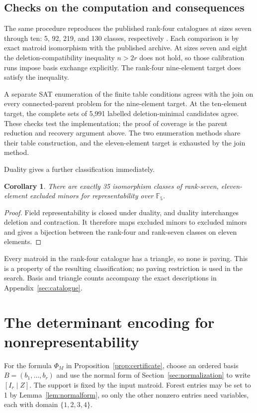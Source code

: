 \documentclass[11pt,a4paper]{article}
\newtheorem{corollary}[theorem]{Corollary}
\theoremstyle{definition}
\newcommand{\F}{\mathbb F_5}
\begin{document}
\subsection{Checks on the computation and consequences}

The same procedure reproduces the published rank-four catalogues
at sizes seven through ten: 5, 92, 219, and 130 classes,
respectively \cite{brettell}. Each comparison is by exact
matroid isomorphism with the published archive. At sizes seven
and eight the deletion-compatibility inequality $n>2r$ does not
hold, so those calibration runs impose basis exchange explicitly.
The rank-four nine-element target does satisfy the inequality.

A separate SAT enumeration of the finite table conditions agrees
with the join on every connected-parent problem for the
nine-element target. At the ten-element target, the complete
sets of 5,991 labelled deletion-minimal candidates agree. These
checks test the implementation; the proof of coverage is the
parent reduction and recovery argument above. The two enumeration
methods share their table construction, and the eleven-element
target is exhausted by the join method.

Duality gives a further classification immediately.
\begin{corollary}\label{cor:dual}
There are exactly 35 isomorphism classes of rank-seven,
eleven-element excluded minors for representability over $\F$.
\end{corollary}
\begin{proof}
Field representability is closed under duality, and duality
interchanges deletion and contraction. It therefore maps
excluded minors to excluded minors and gives a bijection between
the rank-four and rank-seven classes on eleven elements.
\end{proof}

Every matroid in the rank-four catalogue has a triangle, so none
is paving. This is a property of the resulting classification;
no paving restriction is used in the search. Basis and triangle
counts accompany the exact descriptions in
Appendix~\ref{sec:catalogue}.

\appendix
\section{The determinant encoding for nonrepresentability}\label{sec:encoding}

For the formula $\Phi_M$ in Proposition~\ref{prop:certificate},
choose an ordered basis $B=(b_1,\ldots,b_r)$ and use the normal form of
Section~\ref{sec:normalization} to write $[I_r\mid Z]$. The support
is fixed by the input matroid. Forest entries may be set to 1 by
Lemma~\ref{lem:normalform}, so only the other nonzero entries
need variables, each with domain $\{1,2,3,4\}$.
\end{document}
